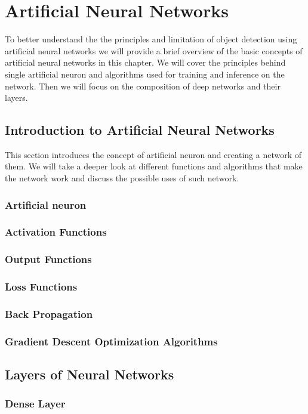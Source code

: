 \chapter{Artificial Neural Networks}
\label{chapt:nnets}
To better understand the the principles and limitation of object detection using artificial neural networks we will provide a brief overview of the basic concepts of artificial neural networks in this chapter. We will cover the principles behind single artificial neuron and algorithms used for training and inference on the network. Then we will focus on the composition of deep networks and their layers.

\section{Introduction to Artificial Neural Networks}
This section introduces the concept of artificial neuron and creating a network of them. We will take a deeper look at different functions and algorithms that make the network work and discuss the possible uses of such network.

\subsection{Artificial neuron}
\subsection{Activation Functions}
\subsection{Output Functions}
\subsection{Loss Functions}
\subsection{Back Propagation}
\subsection{Gradient Descent Optimization Algorithms}

\section{Layers of Neural Networks}
\subsection{Dense Layer}

